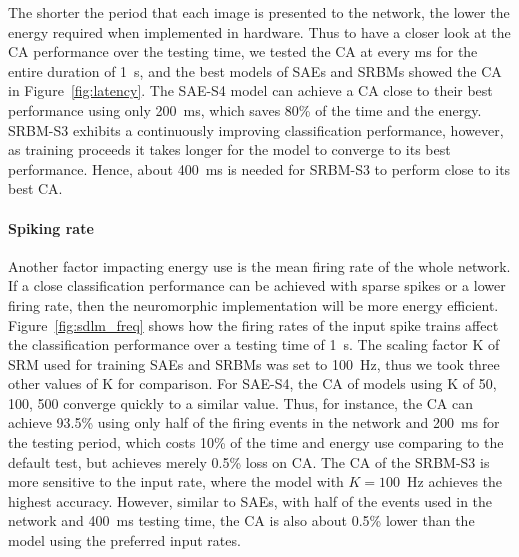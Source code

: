 The shorter the period that each image is presented to the network, the lower the energy required when implemented in hardware.
Thus to have a closer look at the CA performance over the testing time, we tested the CA at every ms for the entire duration of 1~s, and the best models of SAEs and SRBMs showed the CA in Figure~\ref{fig:latency}.
The SAE-S4 model can achieve a CA close to their best performance using only 200~ms, which saves 80\% of the time and the energy.
SRBM-S3 exhibits a continuously improving classification performance, however, as training proceeds it takes longer for the model to converge to its best performance.
Hence, about 400~ms is needed for SRBM-S3 to perform close to its best CA.

\paragraph{Spiking rate\\}

Another factor impacting energy use is the mean firing rate of the whole network.
If a close classification performance can be achieved with sparse spikes or a lower firing rate, then the neuromorphic implementation will be more energy efficient.
Figure~\ref{fig:sdlm_freq} shows how the firing rates of the input spike trains affect the classification performance over a testing time of 1~s.
The scaling factor K of SRM used for training SAEs and SRBMs was set to 100~Hz, thus we took three other values of K for comparison.
For SAE-S4, the CA of models using K of 50, 100, 500 converge quickly to a similar value.
Thus, for instance, the CA can achieve 93.5\% using only half of the firing events in the network and 200~ms for the testing period, which costs 10\% of the time and energy use comparing to the default test, but achieves merely 0.5\% loss on CA.
The CA of the SRBM-S3 is more sensitive to the input rate, where the model with $K=100$~Hz achieves the highest accuracy.
However, similar to SAEs, with half of the events used in the network and 400~ms testing time, the CA is also about 0.5\% lower than the model using the preferred input rates.

